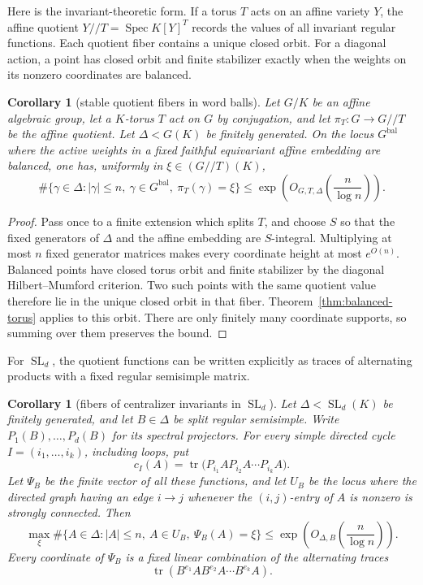 \documentclass[11pt,reqno]{amsart}
\newtheorem{corollary}[theorem]{Corollary}
\theoremstyle{definition}
\theoremstyle{remark}
\newcommand{\Tr}{\operatorname{tr}}
\newcommand{\SL}{\operatorname{SL}}
\newcommand{\sslash}{\mathbin{\! /\! / \!}}
\begin{document}
Here is the invariant-theoretic form.  If a torus \(T\) acts on an affine
variety \(Y\), the affine quotient
\(Y\sslash T=\operatorname{Spec}K[Y]^T\) records the values of all invariant
regular functions.  Each quotient fiber contains a unique closed orbit.  For
a diagonal action, a point has closed orbit and finite stabilizer exactly
when the weights on its nonzero coordinates are balanced.

\begin{corollary}[stable quotient fibers in word balls]
\label{cor:stable-word-fibers}
Let \(G/K\) be an affine algebraic group, let a \(K\)-torus \(T\) act on
\(G\) by conjugation, and let \(\pi_T:G\to G\sslash T\) be the affine
quotient.  Let \(\Delta<G(K)\) be finitely generated.  On the locus
\(G^{\mathrm{bal}}\) where the active weights in a fixed faithful equivariant
affine embedding are balanced, one has, uniformly in
\(\xi\in(G\sslash T)(K)\),
\[
 \#\{\gamma\in\Delta:|\gamma|\le n,\
       \gamma\in G^{\mathrm{bal}},\ \pi_T(\gamma)=\xi\}
 \le\exp\!\left(O_{G,T,\Delta}\!\left(\frac n{\log n}\right)\right).
\tag{12.12}
\]
\end{corollary}

\begin{proof}
Pass once to a finite extension which splits \(T\), and choose \(S\) so that
the fixed generators of \(\Delta\) and the affine embedding are
\(S\)-integral.  Multiplying at most \(n\) fixed generator matrices makes
every coordinate height at most \(e^{O(n)}\).  Balanced points have closed
torus orbit and finite stabilizer by the diagonal Hilbert--Mumford criterion.
Two such points with the same quotient value therefore lie in the unique
closed orbit in that fiber.  Theorem~\ref{thm:balanced-torus} applies to this
orbit.  There are only finitely many coordinate supports, so summing over
them preserves the bound.
\end{proof}

For \(\SL_d\), the quotient functions can be written explicitly as traces
of alternating products with a fixed regular semisimple matrix.

\begin{corollary}[fibers of centralizer invariants in \(\SL_d\)]
\label{cor:sld-centralizer-fibers}
Let \(\Delta<\SL_d(K)\) be finitely generated, and let
\(B\in\Delta\) be split regular semisimple.  Write
\(P_1(B),\ldots,P_d(B)\) for its spectral projectors.  For every simple
directed cycle \(I=(i_1,\ldots,i_k)\), including loops, put
\[
 c_I(A)=\Tr\bigl(P_{i_1}A P_{i_2}A\cdots P_{i_k}A\bigr).
\tag{12.13}
\]
Let \(\Psi_B\) be the finite vector of all these functions, and let \(U_B\)
be the locus where the directed graph having an edge \(i\to j\) whenever
the \((i,j)\)-entry of \(A\) is nonzero is strongly connected.  Then
\[
 \max_\xi\#\{A\in\Delta:|A|\le n,\ A\in U_B,\ \Psi_B(A)=\xi\}
 \le\exp\!\left(O_{\Delta,B}\!\left(\frac n{\log n}\right)\right).
\tag{12.14}
\]
Every coordinate of \(\Psi_B\) is a fixed linear combination of the
alternating traces
\[
 \Tr(B^{e_1}AB^{e_2}A\cdots B^{e_k}A).
\]
\end{corollary}
\end{document}

